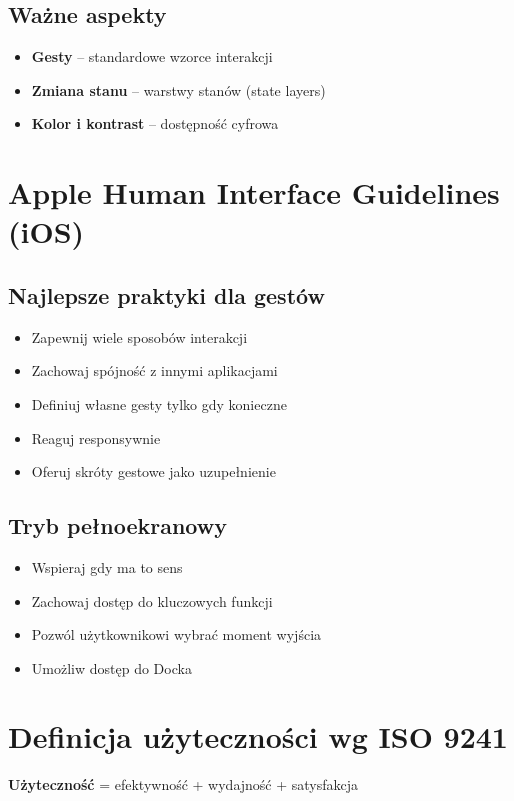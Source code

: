 \subsection{Ważne aspekty}
\begin{itemize}
    \item \textbf{Gesty} -- standardowe wzorce interakcji
    \item \textbf{Zmiana stanu} -- warstwy stanów (state layers)
    \item \textbf{Kolor i kontrast} -- dostępność cyfrowa
\end{itemize}

\section{Apple Human Interface Guidelines (iOS)}

\subsection{Najlepsze praktyki dla gestów}
\begin{itemize}
    \item Zapewnij wiele sposobów interakcji
    \item Zachowaj spójność z innymi aplikacjami
    \item Definiuj własne gesty tylko gdy konieczne
    \item Reaguj responsywnie
    \item Oferuj skróty gestowe jako uzupełnienie
\end{itemize}

\subsection{Tryb pełnoekranowy}
\begin{itemize}
    \item Wspieraj gdy ma to sens
    \item Zachowaj dostęp do kluczowych funkcji
    \item Pozwól użytkownikowi wybrać moment wyjścia
    \item Umożliw dostęp do Docka
\end{itemize}

\section{Definicja użyteczności wg ISO 9241}

\textbf{Użyteczność} = efektywność + wydajność + satysfakcja

